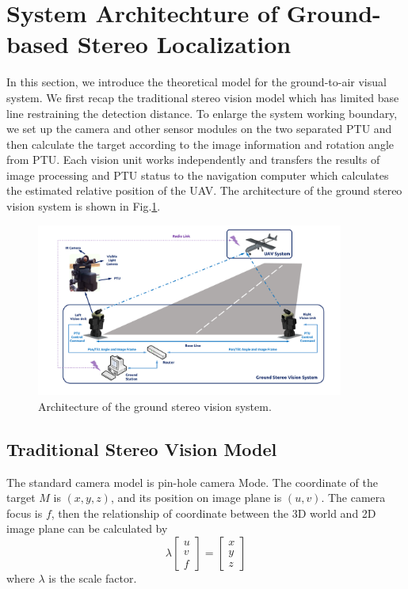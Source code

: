 \section{System Architechture of Ground-based Stereo Localization}
In this section, we introduce the theoretical model for the ground-to-air visual system. We first recap the traditional stereo vision model which has limited base line restraining the detection distance. To enlarge the system working boundary, we set up the camera and other sensor modules on the two separated PTU and then calculate the target according to the image information and rotation angle from PTU. Each vision unit works independently and transfers the results of image processing and PTU status to the navigation computer which calculates the estimated relative position of the UAV. The architecture of the ground stereo vision system is shown in Fig.\ref{fig:SystemStructure}.


\begin{figure}[!tb]
	\centering
	\includegraphics[width=0.9\textwidth]{Figs/SystemStructure2.pdf}
	\caption{Architecture of the ground stereo vision system.}
	\label{fig:SystemStructure}
\end{figure}




\subsection{Traditional Stereo Vision Model}
The standard camera model is pin-hole camera Mode. The coordinate of the target $M$ is $(x,y,z)$, and its position on image plane is $(u,v)$. The camera focus is $f$, then the relationship of coordinate between the 3D world and 2D image plane can be calculated by 
\begin{equation}
	\lambda\left[ {\begin{array}{*{20}{c}}
			u \\ 
			v \\ 
			f 
	\end{array}} \right] =\left[ {\begin{array}{*{20}{c}}
			x \\ 
			y \\ 
			z 
	\end{array}} \right]
\end{equation}
where $\lambda$ is the scale factor. 

